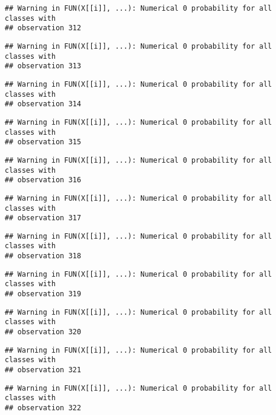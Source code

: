 \documentclass[
]{article}
\begin{document}
\begin{verbatim}
## Warning in FUN(X[[i]], ...): Numerical 0 probability for all classes with
## observation 312
\end{verbatim}

\begin{verbatim}
## Warning in FUN(X[[i]], ...): Numerical 0 probability for all classes with
## observation 313
\end{verbatim}

\begin{verbatim}
## Warning in FUN(X[[i]], ...): Numerical 0 probability for all classes with
## observation 314
\end{verbatim}

\begin{verbatim}
## Warning in FUN(X[[i]], ...): Numerical 0 probability for all classes with
## observation 315
\end{verbatim}

\begin{verbatim}
## Warning in FUN(X[[i]], ...): Numerical 0 probability for all classes with
## observation 316
\end{verbatim}

\begin{verbatim}
## Warning in FUN(X[[i]], ...): Numerical 0 probability for all classes with
## observation 317
\end{verbatim}

\begin{verbatim}
## Warning in FUN(X[[i]], ...): Numerical 0 probability for all classes with
## observation 318
\end{verbatim}

\begin{verbatim}
## Warning in FUN(X[[i]], ...): Numerical 0 probability for all classes with
## observation 319
\end{verbatim}

\begin{verbatim}
## Warning in FUN(X[[i]], ...): Numerical 0 probability for all classes with
## observation 320
\end{verbatim}

\begin{verbatim}
## Warning in FUN(X[[i]], ...): Numerical 0 probability for all classes with
## observation 321
\end{verbatim}

\begin{verbatim}
## Warning in FUN(X[[i]], ...): Numerical 0 probability for all classes with
## observation 322
\end{verbatim}
\end{document}
